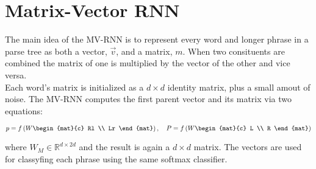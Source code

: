 \section{Matrix-Vector RNN}

The main idea of the MV-RNN is to represent every word and longer phrase in a
parse tree as both a vector, $\vec{v}$, and a matrix, $m$. When two consituents
are combined the matrix of one is multiplied by the vector of the other and vice
versa.\\
Each word's matrix is initialized as a $d \times d$ identity matrix, plus a
small amout of noise. The MV-RNN computes the first parent vector and its matrix
via two equations:

\begin{equation}
	  p = 
	  f\left(W \begin{mat}{c}
		Rl \\
		Lr
	\end{mat} \right), \quad
	P = 
	f\left(W 
	\begin{mat}{c}
		L \\
		R
	\end{mat} 
	\right)
\end{equation}

where $W_M \in \mathbb{R}^{d \times 2d}$ and the result is again a $d \times d$
matrix. The vectors are used for classyfing each phrase using the same softmax
classifier.
